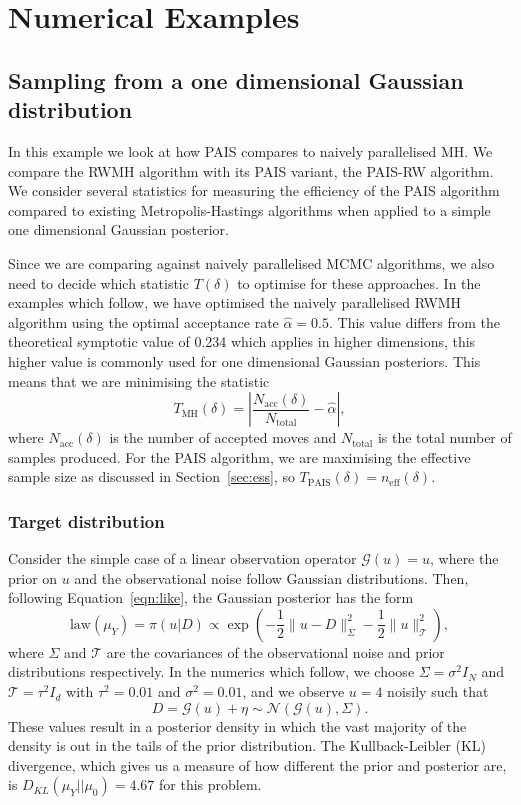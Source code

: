 \documentclass[final]{siamltex}
\newcommand{\G}{\mathcal{G}}
\newcommand{\neff}{n_{\text{eff}}}
\begin{document}
\section{Numerical Examples}\label{Sec:Num}

\subsection{Sampling from a one dimensional Gaussian distribution}\label{sec:problem 1}

In this example we look at how PAIS compares to naively parallelised
MH. We compare the RWMH algorithm \cite{cotter2013mcmc} with its
PAIS variant, the PAIS-RW algorithm. We consider several statistics
for measuring the efficiency of the PAIS algorithm compared to
existing Metropolis-Hastings algorithms when applied to a simple one
dimensional Gaussian posterior.


Since we are comparing against naively parallelised MCMC algorithms,
we also need to decide which statistic $T(\delta)$ to optimise for
these approaches. In the examples which follow, we have optimised the naively parallelised RWMH algorithm using the optimal acceptance rate $\hat{\alpha} = 0.5$. This value differs from the theoretical symptotic value of 0.234 which applies in higher dimensions, this higher value is commonly used for one dimensional Gaussian posteriors. This means that we are minimising the statistic
\[
	T_{\text{MH}}(\delta) = \left| \frac{N_{\text{acc}}(\delta)}{N_{\text{total}}} - \hat{\alpha} \right|,
\]
where $N_{\text{acc}}(\delta)$ is the number of accepted moves and
$N_{\text{total}}$ is the total number of samples produced. For the
PAIS algorithm, we are maximising the effective sample size as
discussed in Section~\ref{sec:ess}, so $T_{\text{PAIS}}(\delta) =
\neff(\delta)$.

\subsubsection{Target distribution}

Consider the simple case of a linear observation operator $\G(u) = u$, where the prior on $u$ and the observational noise follow Gaussian distributions. Then, following Equation~\ref{eqn:like}, the Gaussian posterior has the form
\begin{equation}\label{eqn:Gaussian posterior}
	\text{law}(\mu_Y) = \pi(u|D) \propto \exp\left(-\frac{1}{2}\big\|u - D\big\|^2_\Sigma - \frac{1}{2}\big\|u\big\|^2_{\mathcal{T}}\right),
\end{equation}
where $\Sigma$ and $\mathcal{T}$ are the covariances of the
observational noise and prior distributions respectively. In the
numerics which follow, we choose $\Sigma = \sigma^2I_N$ and
$\mathcal{T} = \tau^2I_d$ with $\tau^2 =0.01$ and $\sigma^2 = 0.01$, and
we observe $u=4$ noisily such that
\[
D = \mathcal{G}(u) + \eta \sim \mathcal{N}(\mathcal{G}(u),\Sigma).
\]
These values result in a posterior density in which the vast majority
of the density is out in the tails of the
prior distribution. The Kullback-Leibler (KL)
divergence, which gives us a measure of how different the prior and
posterior are, is $D_{KL}(\mu_Y || \mu_0) = 4.67$ for this problem.
\end{document}
